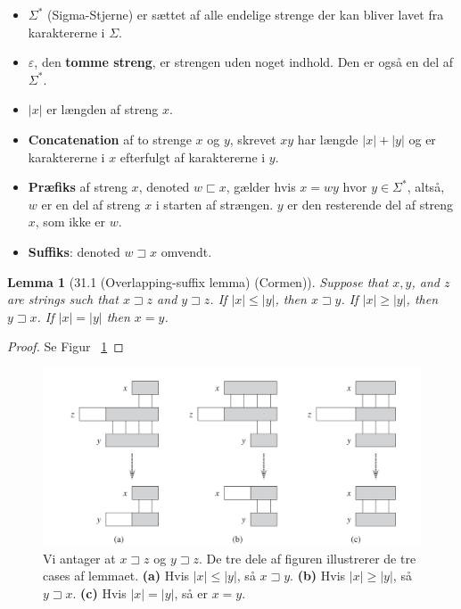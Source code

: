 \documentclass[11pt]{article}
\newtheorem{lemma}[theorem]{Lemma}
\theoremstyle{definition}
\theoremstyle{remark}
\begin{document}
\begin{itemize}
\item $\Sigma^{*}$ (Sigma-Stjerne) er sættet af alle endelige strenge der kan bliver lavet fra karaktererne i $\Sigma$. 
\item $\varepsilon$, den \textbf{tomme streng}, er strengen uden noget indhold. Den er også en del af $\Sigma^{*}$.
\item $|x|$ er længden af streng $x$. 
\item \textbf{Concatenation} af to strenge $x$ og $y$, skrevet $xy$ har længde $|x| + |y|$ og er karaktererne i $x$ efterfulgt af karaktererne i $y$.
\item \textbf{Præfiks} af streng $x$, denoted $w \sqsubset x$, gælder hvis $x = wy$ hvor $y \in \Sigma^{*}$, altså, $w$ er en del af streng $x$ i starten af strængen. $y$ er den resterende del af streng $x$, som ikke er $w$.
\item \textbf{Suffiks}: denoted $w \sqsupset x$ omvendt. 
\end{itemize}

\begin{lemma}[31.1 (Overlapping-suffix lemma) (Cormen)]
Suppose that $x,y$, and $z$ are strings such that $x \sqsupset z$ and $y \sqsupset z$. If $|x| \leq |y|$, then $x \sqsupset y$. If $|x| \geq |y|$, then $y \sqsupset x$. If $|x| = |y|$ then $x = y$.
\end{lemma}

\begin{proof}
  Se Figur ~\ref{fig:overlappingsuffix}
\end{proof}

\begin{figure}[ht]
  \centering
\includegraphics[width=400pt]{main--string-matching--notation-1e22.png}
  \caption{\label{fig:overlappingsuffix} Vi antager at $x \sqsupset z$ og $y \sqsupset z$. De tre dele af figuren illustrerer de tre cases af lemmaet. \textbf{(a)} Hvis $|x| \leq |y|$, så $x \sqsupset y$. \textbf{(b)} Hvis $|x| \geq |y|$, så $y \sqsupset x$. \textbf{(c)} Hvis $|x| = |y|$, så er $x = y$.}
\end{figure}
\end{document}
